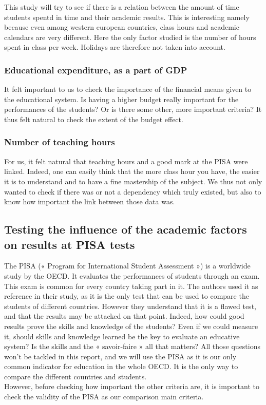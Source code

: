\documentclass[12pt,a4paper]{article}
\begin{document}
This study will try to see if there is a relation between the amount of time students spentd in time and their academic results. This is interesting namely because even among western european countries, class hours and academic calendars are very different. Here the only factor studied is the number of hours spent in class per week. Holidays are therefore not taken into account.

\subsubsection{Educational expenditure, as a part of GDP}

It felt important to us to check the importance of the financial means given to the educational system. Is having a higher budget really important for the performances of the students? Or is there some other, more important criteria? It thus felt natural to check the extent of the budget effect. 

\subsubsection{Number of teaching hours}

For us, it felt natural that teaching hours and a good mark at the PISA were linked. Indeed, one can easily think that the more class hour you have, the easier it is to understand and to have a fine mastership of the subject. We thus not only wanted to check if there was or not a dependency which truly existed, but also to know how important the link between those data was.

\subsection{Testing the influence of the academic factors on results at PISA tests}

The PISA (« Program for International Student Assessment ») is a worldwide study by the OECD. It evaluates the performances of students through an exam. This exam is common for every country taking part in it. The authors used it as reference in their study, as it is the only test that can be used to compare the students of different countries. However they understand that it is a flawed test, and that the results may be attacked on that point. Indeed, how could good results prove the skills and knowledge of the students? Even if we could measure it, should skills and knowledge learned be the key to evaluate an educative system? Is the skills and the « savoir-faire » all that matters? All those questions won’t be tackled in this report, and we will use the PISA as it is our only common indicator for education in the whole OECD. It is the only way to compare the different countries and students.
\\
However, before checking how important the other criteria are, it is important to check the validity of the PISA as our comparison main criteria.
\end{document}
